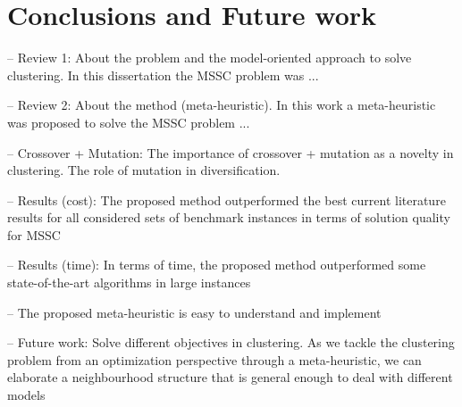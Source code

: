 \chapter{Conclusions and Future work}

-- Review 1: About the problem and the model-oriented approach to solve clustering.
In this dissertation the MSSC problem was ...

-- Review 2: About the method (meta-heuristic).
In this work a meta-heuristic was proposed to solve the MSSC problem ...

-- Crossover + Mutation: The importance of crossover + mutation as a novelty in clustering. The role of mutation in diversification.

-- Results (cost): The proposed method outperformed the best current literature results for all considered sets of benchmark instances in terms of solution quality for MSSC

-- Results (time): In terms of time, the proposed method outperformed some state-of-the-art algorithms in large instances

-- The proposed meta-heuristic is easy to understand and implement

-- Future work: Solve different objectives in clustering. As we tackle the clustering problem from an optimization perspective through a meta-heuristic, we can elaborate a neighbourhood structure that is general enough to deal with different models